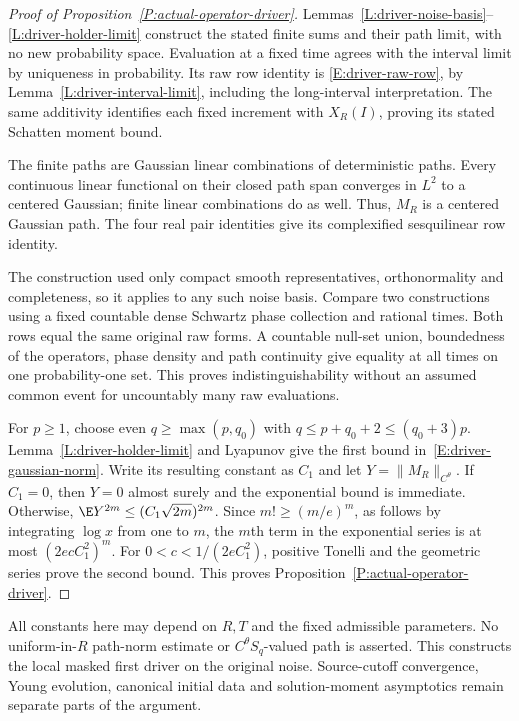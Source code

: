 \begin{proof}[Proof of Proposition~\ref{P:actual-operator-driver}]
  Lemmas~\ref{L:driver-noise-basis}--\ref{L:driver-holder-limit} construct
  the stated finite sums and their path limit, with no new probability
  space. Evaluation at a fixed time agrees with the interval limit by
  uniqueness in probability. Its raw row identity is
  \eqref{E:driver-raw-row}, by Lemma~\ref{L:driver-interval-limit}, including
  the long-interval interpretation. The same additivity identifies each
  fixed increment with $X_R(I)$, proving its stated Schatten moment bound.

  The finite paths are Gaussian linear combinations of deterministic paths.
  Every continuous linear functional on their closed path span converges
  in $L^2$ to a centered Gaussian; finite linear combinations do as well.
  Thus, $M_R$ is a centered Gaussian path. The four real pair identities
  give its complexified sesquilinear row identity.

  The construction used only compact smooth representatives, orthonormality
  and completeness, so it applies to any such noise basis. Compare two
  constructions using a fixed countable dense Schwartz phase collection
  and rational times. Both rows equal the same original raw forms.
  A countable null-set union, boundedness of the operators, phase density
  and path continuity give equality at all times on one probability-one
  set. This proves indistinguishability without an assumed common event
  for uncountably many raw evaluations.

  For $p\ge1$, choose even $q\ge\max(p,q_0)$ with
  $q\le p+q_0+2\le(q_0+3)p$. Lemma~\ref{L:driver-holder-limit} and
  Lyapunov give the first bound in~\eqref{E:driver-gaussian-norm}.
  Write its resulting constant as $C_1$ and let $Y=\|M_R\|_{C^\theta}$.
  If $C_1=0$, then $Y=0$ almost surely and the exponential bound is
  immediate. Otherwise,
  $\E Y^{2m}\le(C_1\sqrt{2m})^{2m}$. Since
  $m!\ge(m/e)^m$, as follows by integrating $\log x$ from one to $m$,
  the $m$th term in the exponential series is at most
  $(2ecC_1^2)^m$. For $0<c<1/(2eC_1^2)$, positive Tonelli and the
  geometric series prove the second bound.
  This proves Proposition~\ref{P:actual-operator-driver}.
\end{proof}

All constants here may depend on $R,T$ and the fixed admissible parameters.
No uniform-in-$R$ path-norm estimate or $C^\theta S_q$-valued path is
asserted. This constructs the local masked first driver on the original
noise. Source-cutoff convergence, Young evolution, canonical initial data
and solution-moment asymptotics remain separate parts of the argument.

